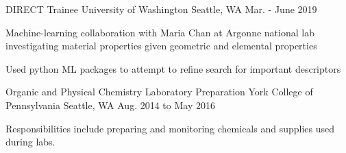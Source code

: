 

\begin{cventries}

 \cventry
   {DIRECT Trainee} %
   {University of Washington} %
   {Seattle, WA} %
   {Mar. - June 2019} %
   {
     \begin{cvitems} %
       \item {Machine-learning collaboration with Maria Chan at Argonne national lab investigating material properties given geometric and elemental properties}
       \item {Used python ML packages to attempt to refine search for important descriptors}
     \end{cvitems}
   }



  \cventry
    {Organic and Physical Chemistry Laboratory Preparation} %
    {York College of Pennsylvania} %
    {Seattle, WA} %
    {Aug. 2014 to May 2016} %
    {
      \begin{cvitems} %
        \item {Responsibilities include preparing and monitoring chemicals and supplies used during labs.}
      \end{cvitems}
    }


\end{cventries}
